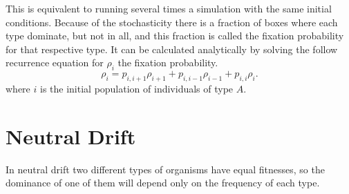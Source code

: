This is equivalent to running several times a simulation with the same initial conditions. Because of the stochasticity there is a fraction of boxes where each type dominate, but not in all, and this fraction is called the fixation probability for that respective type. It can be calculated analytically by solving the follow recurrence   equation for $\rho_{i}$ the fixation probability.
\begin{equation}
\rho_{i}=p_{i,i+1}\rho_{i+1}+p_{i,i-1}\rho_{i-1}+p_{i,i}\rho_{i}.
\end{equation} 
where $i$ is the initial population of individuals of type $A$.
\section{Neutral Drift}
In neutral drift two different types of organisms have equal fitnesses, so the dominance of one of them will depend only on the frequency of each type.  

